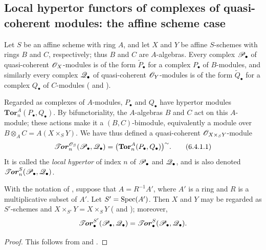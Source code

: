 \subsection{Local hypertor functors of complexes of quasi-coherent modules: the affine scheme case}
\label{subsection:III.6.4}
\label{III.6.4}

\begin{env}[6.4.1]
\label{III.6.4.1}
Let $S$ be an affine scheme with ring $A$, and let $X$ and $Y$ be
affine $S$-schemes with rings $B$ and $C$, respectively; thus $B$
and $C$ are $A$-algebras.  Every complex $\mathscr{P}_\bullet$ of
quasi-coherent $\mathscr{O}_X$-modules is of the form
$\widetilde{P}_\bullet$ for a complex $P_\bullet$ of $B$-modules,
and similarly every complex $\mathscr{Q}_\bullet$ of quasi-coherent
$\mathscr{O}_Y$-modules is of the form $\widetilde{Q}_\bullet$ for a
complex $Q_\bullet$ of $C$-modules
( and ).

Regarded as complexes of $A$-modules, $P_\bullet$ and $Q_\bullet$
have hypertor modules
$\mathbf{Tor}_n^A(P_\bullet,Q_\bullet)$.  By bifunctoriality, the
$A$-algebras $B$ and $C$ act on this $A$-module; these actions make
it a $(B,C)$-bimodule, equivalently a module over $B\otimes_AC=A(X\times_SY)$.
We have thus defined a quasi-coherent
$\mathscr{O}_{X\times_SY}$-module
\[
  \boldsymbol{\mathscr{T}\!\mathit{or}}_n^{\mathscr{O}_S}(\mathscr{P}_\bullet,\mathscr{Q}_\bullet)
  =
  \bigl(\mathbf{Tor}_n^A(P_\bullet,Q_\bullet)\bigr)^{\sim}.
  \tag{6.4.1.1}\label{III.6.4.1.1}
\]
It is called the \emph{local hypertor} of index $n$ of
$\mathscr{P}_\bullet$ and $\mathscr{Q}_\bullet$, and is also denoted
$\boldsymbol{\mathscr{T}\!\mathit{or}}_n^S(\mathscr{P}_\bullet,\mathscr{Q}_\bullet)$.
\end{env}

\begin{lemma}[6.4.2]
\label{III.6.4.2}
With the notation of , suppose that
$A=R^{-1}A'$, where $A'$ is a ring and $R$ is a multiplicative
subset of $A'$.  Let $S'=\operatorname{Spec}(A')$.  Then $X$ and $Y$ may be
regarded as $S'$-schemes and
$X\times_{S'}Y=X\times_SY$
( and ); moreover,
\[
  \boldsymbol{\mathscr{T}\!\mathit{or}}_\bullet^{S'}(\mathscr{P}_\bullet,\mathscr{Q}_\bullet)
  =
  \boldsymbol{\mathscr{T}\!\mathit{or}}_\bullet^S(\mathscr{P}_\bullet,\mathscr{Q}_\bullet).
\]
\end{lemma}

\begin{proof}
This follows from  and .
\end{proof}

